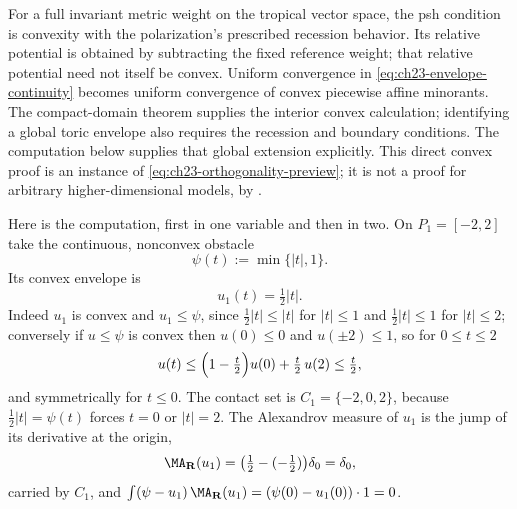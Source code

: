 \begin{example}
\label{ex:ch23-toric-orthogonality}
For a full invariant metric weight on the tropical vector space, the
psh condition is convexity with the polarization's prescribed recession
behavior.  Its relative potential is obtained by subtracting the fixed
reference weight; that relative potential need not itself be convex.  Uniform convergence in
\eqref{eq:ch23-envelope-continuity} becomes uniform convergence of convex
piecewise affine minorants.  The compact-domain theorem
 supplies the interior
convex calculation; identifying a global toric envelope also requires
the recession and boundary conditions.  The computation below supplies
that global extension explicitly.  This
direct convex proof is an instance of
\eqref{eq:ch23-orthogonality-preview}; it is not a proof for arbitrary
higher-dimensional models, by .

Here is the computation, first in one variable and then in two.  On
$P_1=[-2,2]$ take the continuous, nonconvex obstacle
\[
 \psi(t):=\min\{|t|,1\} .
\]
Its convex envelope is
\[
 u_1(t)=\tfrac12|t| .
\]
Indeed $u_1$ is convex and $u_1\leq\psi$, since
$\tfrac12|t|\leq|t|$ for $|t|\leq1$ and $\tfrac12|t|\leq1$ for
$|t|\leq2$; conversely if $u\leq\psi$ is convex then $u(0)\leq0$ and
$u(\pm2)\leq1$, so for $0\leq t\leq2$
\[
 u(t)\leq\Bigl(1-\tfrac t2\Bigr)u(0)+\tfrac t2\,u(2)\leq\tfrac t2 ,
\]
and symmetrically for $t\leq0$.  The contact set is
$C_1=\{-2,0,2\}$, because $\tfrac12|t|=\psi(t)$ forces $t=0$ or
$|t|=2$.  The Alexandrov measure of $u_1$ is the jump of its derivative
at the origin,
\[
 \MA_{\mathbf R}(u_1)=\bigl(\tfrac12-(-\tfrac12)\bigr)\delta_0=\delta_0 ,
\]
carried by $C_1$, and
$\int(\psi-u_1)\,\MA_{\mathbf R}(u_1)=(\psi(0)-u_1(0))\cdot1=0$.


\end{example}

